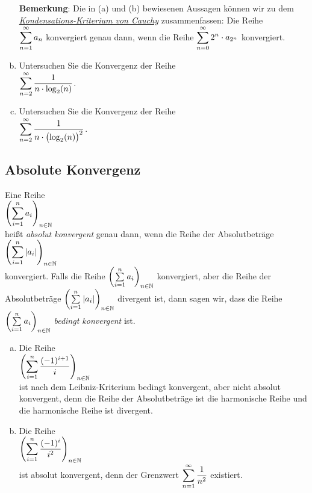 \begin{enumerate}[(a)]
      \textbf{Bemerkung}:  Die in (a) und (b) bewiesenen Aussagen k\"onnen wir zu dem
      \href{http://de.wikipedia.org/wiki/Cauchysches_Verdichtungskriterium}{\emph{Kondensations-Kriterium von Cauchy}} 
      zusammenfassen:  Die Reihe 
      \\[0.2cm]
      \hspace*{1.3cm}
      $\displaystyle\sum\limits_{n=1}^\infty a_n$ \quad konvergiert genau dann, wenn die Reihe \quad
      $\displaystyle\sum\limits_{n=0}^\infty 2^n \cdot a_{2^n}$ \quad konvergiert.
\item Untersuchen Sie die Konvergenz der Reihe
      \\[0.2cm]
      \hspace*{1.3cm}
      $\displaystyle\sum\limits_{n=2}^{\infty} \frac{1}{n \cdot \log_2(n)}$.
\item Untersuchen Sie die Konvergenz der Reihe
      \\[0.2cm]
      \hspace*{1.3cm}
      $\displaystyle\sum\limits_{n=2}^{\infty} \frac{1}{n \cdot \bigl(\log_2(n)\bigr)^2}$. \eox
\end{enumerate}

\subsection{Absolute Konvergenz}
\begin{Definition}
Eine Reihe
\\[0.2cm]
\hspace*{1.3cm}
 $\displaystyle\left(\sum\limits_{i=1}^n a_i\right)_{n\in\mathbb{N}}$ 
\\[0.2cm]
hei\ss{}t \emph{absolut konvergent} genau dann, wenn die Reihe der Absolutbetr\"age
\\[0.2cm]
\hspace*{1.3cm}
 $\displaystyle\left(\sum\limits_{i=1}^n |a_i|\right)_{n\in\mathbb{N}}$ 
\\[0.2cm]
konvergiert.  Falls die Reihe
 $\left(\sum\limits_{i=1}^n a_i\right)_{n\in\mathbb{N}}$
konvergiert, aber die Reihe der Absolutbetr\"age
$\left(\sum\limits_{i=1}^n |a_i|\right)_{n\in\mathbb{N}}$ 
divergent ist,  dann sagen wir, dass die Reihe
 $\left(\sum\limits_{i=1}^n a_i\right)_{n\in\mathbb{N}}$ 
\emph{bedingt konvergent} ist.  \eod
\end{Definition}

\examples
\begin{enumerate}[(a)]
\item Die Reihe
      \\[0.2cm]
      \hspace*{1.3cm}
      $\displaystyle\left(\sum\limits_{i=1}^n \frac{(-1)^{i+1}}{i}\right)_{n\in\mathbb{N}}$
      \\[0.2cm]
      ist nach dem Leibniz-Kriterium bedingt konvergent, aber nicht absolut konvergent, denn die Reihe der Absolutbetr\"age ist
      die harmonische Reihe und die harmonische Reihe ist divergent.
\item Die Reihe
      \\[0.2cm]
      \hspace*{1.3cm}
      $\displaystyle\left(\sum\limits_{i=1}^n \frac{(-1)^i}{i^2}\right)_{n\in\mathbb{N}}$
      \\[0.2cm]
      ist absolut konvergent, denn der Grenzwert $\displaystyle\sum\limits_{n=1}^\infty \frac{1}{n^2}$ existiert. \eox
\end{enumerate}

